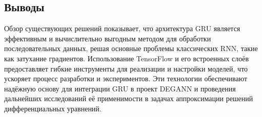 \subsection{Выводы}

Обзор существующих решений показывает, что архитектура GRU является эффективным и вычислительно выгодным методом для обработки последовательных данных, решая основные проблемы классических RNN, такие как затухание градиентов. Использование TensorFlow и его встроенных слоёв предоставляет гибкие инструменты для реализации и настройки моделей, что ускоряет процесс разработки и экспериментов. Эти технологии обеспечивают надёжную основу для интеграции GRU в проект DEGANN и проведения дальнейших исследований её применимости в задачах аппроксимации решений дифференциальных уравнений.
